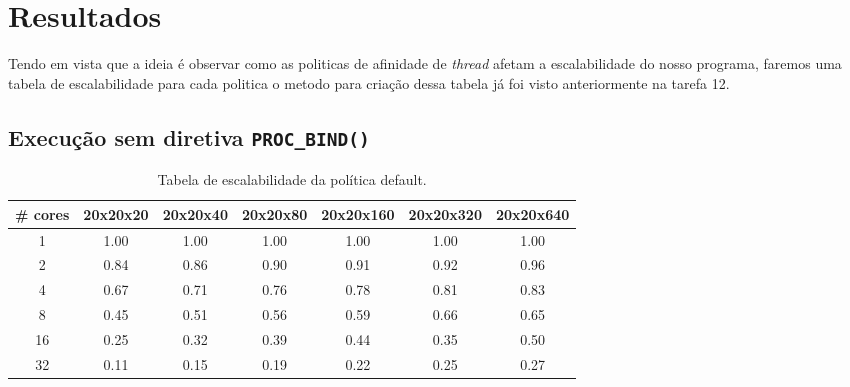 \documentclass[a4paper, 12pt]{article}
\begin{document}
	\section{Resultados}
	Tendo em vista que a ideia é observar como as politicas de afinidade de \textit{thread} afetam a escalabilidade do nosso programa, faremos uma tabela de escalabilidade para cada politica o metodo para criação dessa tabela já foi visto anteriormente na tarefa 12.
	
	\subsection{Execução sem diretiva \texttt{PROC\_BIND()}}	
	\begin{table}[htbp]
		\centering
		\begin{tabular}{|c|c|c|c|c|c|c|}
			\hline
			\textbf{\# cores }& \textbf{20x20x20} & \textbf{20x20x40} & \textbf{20x20x80} & \textbf{20x20x160} & \textbf{20x20x320} & \textbf{20x20x640} \\ \hline
			1        & 1.00     & 1.00     & 1.00     & 1.00      & 1.00      & 1.00      \\ \hline
			2        & 0.84     & 0.86     & 0.90     & 0.91      & 0.92      & 0.96      \\ \hline
			4        & 0.67     & 0.71     & 0.76     & 0.78      & 0.81      & 0.83      \\ \hline
			8        & 0.45     & 0.51     & 0.56     & 0.59      & 0.66      & 0.65      \\ \hline
			16       & 0.25     & 0.32     & 0.39     & 0.44      & 0.35      & 0.50      \\ \hline
			32       & 0.11     & 0.15     & 0.19     & 0.22      & 0.25      & 0.27      \\ \hline
		\end{tabular}
		\caption{Tabela de escalabilidade da política default.}
	\end{table}
	
	\FloatBarrier
	
\end{document}
